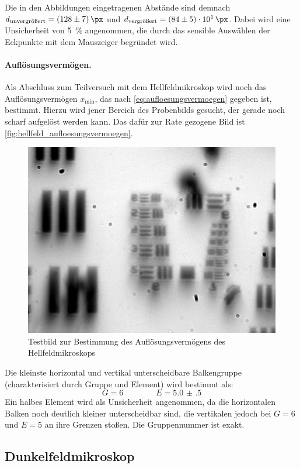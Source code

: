 \documentclass[english, ngerman]{scrartcl}
\begin{document}
\setcaphanging
%
Die in den Abbildungen eingetragenen Abstände sind demnach $d_\text{unvergrößert}=\SI{128(7)}{\px}$ und $d_\text{vergrößert}=\SI{84(5)e1}{\px}$. Dabei wird eine Unsicherheit von \SI{5}{\percent} angenommen, die durch das sensible Auswählen der Eckpunkte mit dem Mauszeiger begründet wird.

\paragraph{Auflösungsvermögen.}
Als Abschluss zum Teilversuch mit dem Hellfeldmikroskop wird noch das Auflösungsvermögen $x_\text{min}$, das nach \autoref{eq:aufloesungsvermoegen} gegeben ist, bestimmt. Hierzu wird jener Bereich des Probenbilds gesucht, der gerade noch scharf aufgelöst werden kann. Das dafür zur Rate gezogene Bild ist \autoref{fig:hellfeld_aufloesungsvermoegen}.
%
\begin{figure}[H]
    \centering
    \begin{samepage}
        \includegraphics[width=0.475\linewidth]{fig/Versuch3/hellfeld_4.2_aufloesungsvermoegen.jpg}
        \caption[Hellfeld Auflösungsvermögen]{Testbild zur Bestimmung des Auflösungsvermögens des Hellfeldmikroskops}
        \label{fig:hellfeld_aufloesungsvermoegen}
    \end{samepage}
\end{figure}
Die kleinste horizontal und vertikal unterscheidbare Balkengruppe (charakterisiert durch Gruppe und Element) wird bestimmt als:
\[G=6 \qquad\qquad E=\num{5.0(5)}\]
Ein halbes Element wird als Unsicherheit angenommen, da die horizontalen Balken noch deutlich kleiner unterscheidbar sind, die vertikalen jedoch bei $G=6$ und $E=5$ an ihre Grenzen stoßen. Die Gruppennummer ist exakt.


\subsection{Dunkelfeldmikroskop}
\label{subsec:durchfuehrung_dunkelfeld}
\end{document}
